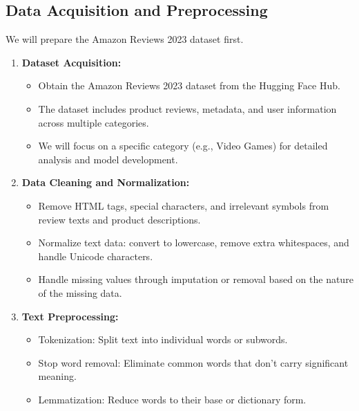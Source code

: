 \documentclass{article}
\begin{document}
\subsection{Data Acquisition and Preprocessing} 
We will prepare the Amazon Reviews 2023 dataset first.
\begin{enumerate}
    \item \textbf{Dataset Acquisition:} 
    \begin{itemize}
        \item Obtain the Amazon Reviews 2023 dataset from the Hugging Face Hub.
        \item The dataset includes product reviews, metadata, and user information across multiple categories.
        \item We will focus on a specific category (e.g., Video Games) for detailed analysis and model development.
    \end{itemize}
    
    \item \textbf{Data Cleaning and Normalization:}
    \begin{itemize}
        \item Remove HTML tags, special characters, and irrelevant symbols from review texts and product descriptions.
        \item Normalize text data: convert to lowercase, remove extra whitespaces, and handle Unicode characters.
        \item Handle missing values through imputation or removal based on the nature of the missing data.
    \end{itemize}
    
    \item \textbf{Text Preprocessing:}
    \begin{itemize}
        \item Tokenization: Split text into individual words or subwords.
        \item Stop word removal: Eliminate common words that don't carry significant meaning.
        \item Lemmatization: Reduce words to their base or dictionary form.
    \end{itemize}
    
\end{enumerate}
\end{document}
